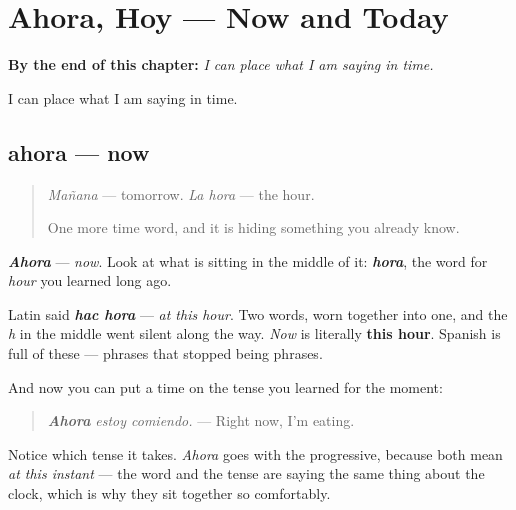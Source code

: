 
\chapter{Ahora, Hoy --- Now and Today}
\label{ch:ahora-hoy}

\begin{chapteropening}
\textbf{By the end of this chapter:} \emph{I can place what I am saying in time.}

I can place what I am saying in time.
\end{chapteropening}

\section[ahora]{ahora — now}

\label{lesson:ES-C65-ahora-hoy}



\begin{quote}
\emph{Mañana} — tomorrow. \emph{La hora} — the hour.

One more time word, and it is hiding something you already know.
\end{quote}

\begin{cousinweb}
\emph{\textbf{Ahora}} — \emph{now}. Look at what is sitting in the middle of it: \emph{\textbf{hora}}, the word for \emph{hour} you learned long ago.

Latin said \emph{\textbf{hac hora}} — \emph{at this hour}. Two words, worn together into one, and the \emph{h} in the middle went silent along the way. \emph{Now} is literally \textbf{this hour}. Spanish is full of these — phrases that stopped being phrases.
\end{cousinweb}

\begin{culture}
And now you can put a time on the tense you learned for the moment:

\begin{quote}
\emph{\textbf{Ahora}} \emph{estoy comiendo.} — Right now, I'm eating.
\end{quote}

Notice which tense it takes. \emph{Ahora} goes with the progressive, because both mean \emph{at this instant} — the word and the tense are saying the same thing about the clock, which is why they sit together so comfortably.
\end{culture}


